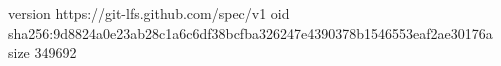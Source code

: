 version https://git-lfs.github.com/spec/v1
oid sha256:9d8824a0e23ab28c1a6c6df38bcfba326247e4390378b1546553eaf2ae30176a
size 349692
